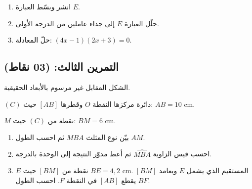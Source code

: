 \documentclass[12pt,a4paper]{article}
\begin{document}
\begin{enumerate}
    \item انشر وبسّط العبارة $E$.
    \item حلّل العبارة $E$ إلى جداء عاملين من الدرجة الأولى.
    \item حلّ المعادلة: $(4x-1)(2x+3) = 0$.
\end{enumerate}

\subsection*{التمرين الثالث: (03 نقاط)}

الشكل المقابل غير مرسوم بالأبعاد الحقيقية.

\begin{center}
\end{center}

$(C)$ دائرة مركزها النقطة $O$ وقطرها $[AB]$ حيث: $AB = 10$ cm.

$M$ نقطة من $(C)$ حيث: $BM = 6$ cm.

\begin{enumerate}
    \item بيّن نوع المثلث $MBA$ ثم احسب الطول $AM$.
    \item احسب قيس الزاوية $\widehat{MBA}$ ثم أعط مدوّر النتيجة إلى الوحدة بالدرجة.
    \item $E$ نقطة من $[BM]$ حيث $BE = 4{,}2$ cm. المستقيم الذي يشمل $E$ ويعامد $[BM]$ يقطع $[AB]$ في النقطة $F$. احسب الطول $BF$.
\end{enumerate}
\end{document}
